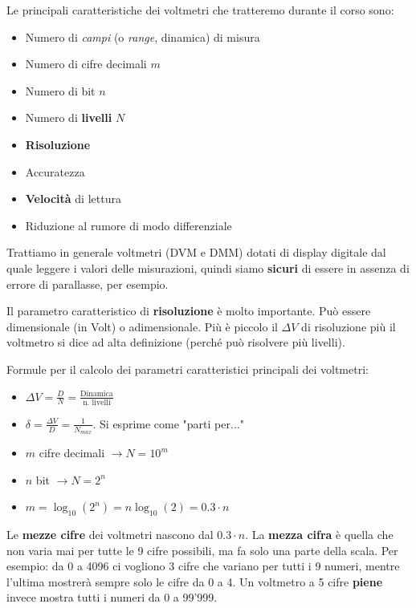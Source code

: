 \documentclass[a4paper,11pt]{report}
\begin{document}
Le principali caratteristiche dei voltmetri che tratteremo durante il corso sono:
\begin{itemize}
  \item Numero di \textit{campi} (o \textit{range}, dinamica) di misura
  \item Numero di cifre decimali $ m $
  \item Numero di bit $ n $
  \item Numero di \textbf{livelli} $ N $
  \item \textbf{Risoluzione}
  \item Accuratezza
  \item \textbf{Velocità} di lettura
  \item Riduzione al rumore di modo differenziale
\end{itemize}
Trattiamo in generale voltmetri (DVM e DMM) dotati di display digitale dal quale leggere i valori delle misurazioni, quindi siamo \textbf{sicuri} di essere in assenza di errore di parallasse, per esempio.

Il parametro caratteristico di \textbf{risoluzione} è molto importante. Può essere dimensionale (in Volt) o adimensionale. Più è piccolo il $\Delta V$ di risoluzione più il voltmetro si dice ad alta definizione (perché può risolvere più livelli).

Formule per il calcolo dei parametri caratteristici principali dei voltmetri:
\begin{itemize}
  \item $ \Delta V = \frac{D}{N} = \frac{\text{Dinamica}}{\text{n. livelli}} $
  \item $ \delta = \frac{\Delta V}{D} = \frac{1}{N_{max}}$. Si esprime come "parti per..."
  \item $ m $ cifre decimali $ \rightarrow N = 10^m$
  \item $ n $ bit $ \rightarrow N = 2^n $
  \item $ m = \log_{10}(2^n) = n\log_{10}(2) = 0.3\cdot n $
\end{itemize} 

Le \textbf{mezze cifre} dei voltmetri nascono dal $ 0.3 \cdot n $. La \textbf{mezza cifra} è quella che non varia mai per tutte le 9 cifre possibili, ma fa solo una parte della scala. Per esempio: da 0 a 4096 ci vogliono 3 cifre che variano per tutti i 9 numeri, mentre l'ultima mostrerà sempre solo le cifre da 0 a 4. Un voltmetro a 5 cifre \textbf{piene} invece mostra tutti i numeri da 0 a 99'999.
\end{document}
